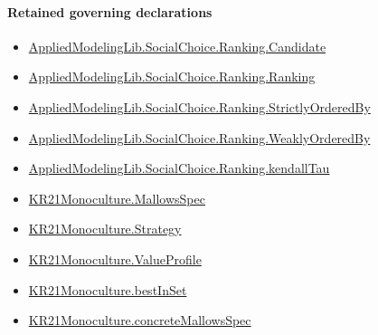 \documentclass[10pt]{article}
\begin{document}
\paragraph{Retained governing declarations}
\begin{itemize}\raggedright
\item \hyperlink{library-prerequisite-8c0e6c25845ae78a}{Applied\allowbreak{}Modeling\allowbreak{}Lib.\allowbreak{}Social\allowbreak{}Choice.\allowbreak{}Ranking.\allowbreak{}Candidate}
\item \hyperlink{library-prerequisite-5cde54446d1ae021}{Applied\allowbreak{}Modeling\allowbreak{}Lib.\allowbreak{}Social\allowbreak{}Choice.\allowbreak{}Ranking.\allowbreak{}Ranking}
\item \hyperlink{library-prerequisite-3585717d1635654a}{Applied\allowbreak{}Modeling\allowbreak{}Lib.\allowbreak{}Social\allowbreak{}Choice.\allowbreak{}Ranking.\allowbreak{}Strictly\allowbreak{}Ordered\allowbreak{}By}
\item \hyperlink{governing-declaration-8f931d8e12d7cf4a}{Applied\allowbreak{}Modeling\allowbreak{}Lib.\allowbreak{}Social\allowbreak{}Choice.\allowbreak{}Ranking.\allowbreak{}Weakly\allowbreak{}Ordered\allowbreak{}By}
\item \hyperlink{governing-declaration-127efd44d176e2ba}{Applied\allowbreak{}Modeling\allowbreak{}Lib.\allowbreak{}Social\allowbreak{}Choice.\allowbreak{}Ranking.\allowbreak{}kendall\allowbreak{}Tau}
\item \hyperlink{governing-declaration-b2e6ec0602659b07}{KR21\allowbreak{}Monoculture.\allowbreak{}Mallows\allowbreak{}Spec}
\item \hyperlink{paper-prerequisite-b00425a844bd2ddf}{KR21\allowbreak{}Monoculture.\allowbreak{}Strategy}
\item \hyperlink{paper-prerequisite-c0e41e9b0e843969}{KR21\allowbreak{}Monoculture.\allowbreak{}Value\allowbreak{}Profile}
\item \hyperlink{governing-declaration-f2dc4b58640ac1df}{KR21\allowbreak{}Monoculture.\allowbreak{}best\allowbreak{}In\allowbreak{}Set}
\item \hyperlink{governing-declaration-0e399c7dd166853c}{KR21\allowbreak{}Monoculture.\allowbreak{}concrete\allowbreak{}Mallows\allowbreak{}Spec}
\end{itemize}
\end{document}
